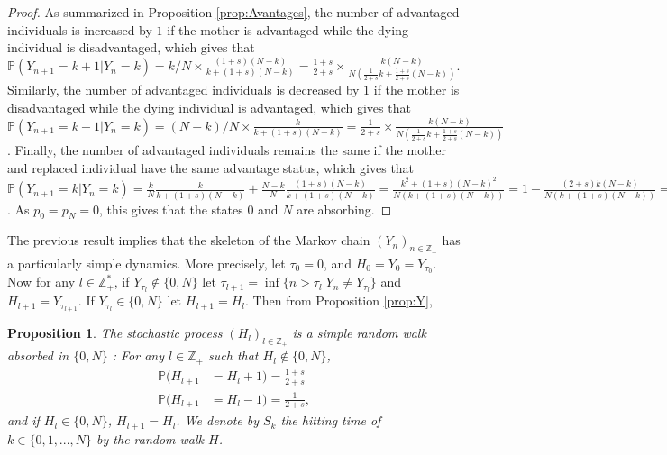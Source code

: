 \documentclass[11pt]{article}
\newtheorem{proposition}[theorem]{Proposition}
\theoremstyle{remark}
\numberwithin{equation}{section}
\begin{document}
\begin{proof} As summarized in Proposition \ref{prop:Avantages}, the number of advantaged individuals is increased by $1$ if the mother is advantaged while the dying individual is disadvantaged, which gives that $\mathbb{P}(Y_{n+1}=k+1|Y_n=k)=k/N\times\frac{(1+s)(N-k)}{k+(1+s)(N-k)}=\frac{1+s}{2+s}\times \frac{k(N-k)}{N(\frac{1}{2+s}k+\frac{1+s}{2+s}(N-k))}$. Similarly, the number of advantaged individuals is decreased by $1$ if the mother is disadvantaged while the dying individual is advantaged, which gives that $\mathbb{P}(Y_{n+1}=k-1|Y_n=k)=(N-k)/N\times\frac{k}{k+(1+s)(N-k)}=\frac{1}{2+s}\times \frac{k(N-k)}{N(\frac{1}{2+s}k+\frac{1+s}{2+s}(N-k))}$. Finally, the number of advantaged individuals remains the same if the mother and replaced individual have the same advantage status, which gives that $\mathbb{P}(Y_{n+1}=k|Y_n=k)=\frac{k}{N}\frac{k}{k+(1+s)(N-k)}+\frac{N-k}{N}\frac{(1+s)(N-k)}{k+(1+s)(N-k)}=\frac{k^2+(1+s)(N-k)^2}{N(k+(1+s)(N-k))}=1-\frac{(2+s)k(N-k)}{N(k+(1+s)(N-k))}=1-p_k$. As $p_0=p_N=0$, this gives that the states $0$ and $N$ are absorbing.
\end{proof}

The previous result implies that the skeleton of the Markov chain $(Y_n)_{n\in\mathbb{Z}_+}$ has a particularly simple dynamics. More precisely, let $\tau_0=0$, and $H_0=Y_0=Y_{\tau_0}$. Now for any $l\in\mathbb{Z}_+^*$, if $Y_{\tau_l}\notin\{0,N\}$ let $\tau_{l+1}=\inf\{n>\tau_l|Y_n\neq Y_{\tau_l}\}$ and $H_{l+1}=Y_{\tau_{l+1}}$. If $Y_{\tau_l}\in\{0,N\}$ let $H_{l+1}=H_l$. Then from Proposition \ref{prop:Y}, 
\begin{proposition}\label{prop-biasedRW}
The stochastic process $(H_l)_{l\in\mathbb{Z}_+}$ is a simple random walk absorbed in $\{0,N\}$ : For any $l\in\mathbb{Z}_+$ such that $H_l\notin\{0,N\}$,
\begin{align}\mathbb{P}(H_{l+1}&=H_{l}+1)=\frac{1+s}{2+s}\\\mathbb{P}(H_{l+1}&=H_{l}-1)=\frac{1}{2+s},\end{align} and if $H_l\in\{0,N\}$, $H_{l+1}=H_l$. We denote by $S_k$ the hitting time of $k\in\{0,1,...,N\}$ by the random walk $H$.
\end{proposition}
\end{document}

